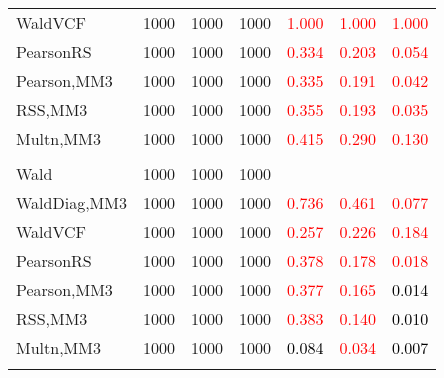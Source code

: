 \documentclass[
]{article}
\begin{document}
\begin{table}[H]
{\begin{tabular}[t]{lrrrrrr}
\hspace{1em}WaldVCF & 1000 & 1000 & 1000 & \textcolor{red}{1.000} & \textcolor{red}{1.000} & \textcolor{red}{1.000}\\
\hspace{1em}PearsonRS & 1000 & 1000 & 1000 & \textcolor{red}{0.334} & \textcolor{red}{0.203} & \textcolor{red}{0.054}\\
\hspace{1em}Pearson,MM3 & 1000 & 1000 & 1000 & \textcolor{red}{0.335} & \textcolor{red}{0.191} & \textcolor{red}{0.042}\\
\hspace{1em}RSS,MM3 & 1000 & 1000 & 1000 & \textcolor{red}{0.355} & \textcolor{red}{0.193} & \textcolor{red}{0.035}\\
\hspace{1em}Multn,MM3 & 1000 & 1000 & 1000 & \textcolor{red}{0.415} & \textcolor{red}{0.290} & \textcolor{red}{0.130}\\
\addlinespace[0.3em]
\multicolumn{7}{l}{\textbf{1F 15V}}\\
\hspace{1em}Wald & 1000 & 1000 & 1000 & \textcolor{black}{} & \textcolor{black}{} & \vphantom{1} \textcolor{black}{}\\
\hspace{1em}WaldDiag,MM3 & 1000 & 1000 & 1000 & \textcolor{red}{0.736} & \textcolor{red}{0.461} & \textcolor{red}{0.077}\\
\hspace{1em}WaldVCF & 1000 & 1000 & 1000 & \textcolor{red}{0.257} & \textcolor{red}{0.226} & \textcolor{red}{0.184}\\
\hspace{1em}PearsonRS & 1000 & 1000 & 1000 & \textcolor{red}{0.378} & \textcolor{red}{0.178} & \textcolor{red}{0.018}\\
\hspace{1em}Pearson,MM3 & 1000 & 1000 & 1000 & \textcolor{red}{0.377} & \textcolor{red}{0.165} & \textcolor{black}{0.014}\\
\hspace{1em}RSS,MM3 & 1000 & 1000 & 1000 & \textcolor{red}{0.383} & \textcolor{red}{0.140} & \textcolor{black}{0.010}\\
\hspace{1em}Multn,MM3 & 1000 & 1000 & 1000 & \textcolor{black}{0.084} & \textcolor{red}{0.034} & \textcolor{black}{0.007}\\
\addlinespace[0.3em]
\multicolumn{7}{l}{\textbf{2F 10V}}\\

\end{tabular}}
\end{table}
\end{document}
